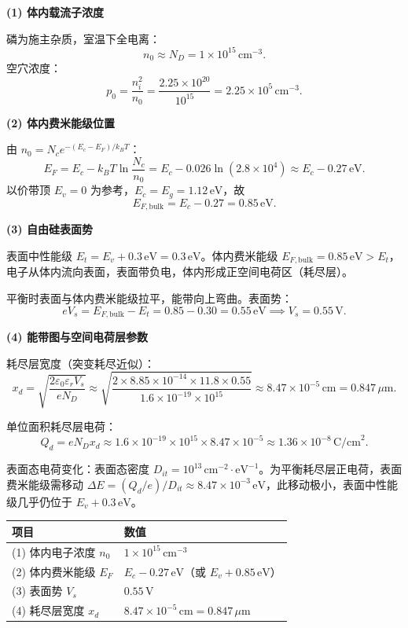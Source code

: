\begin{derivationbox}[标准解题过程]
\textbf{(1) 体内载流子浓度}

磷为施主杂质，室温下全电离：
\[
n_0\approx N_D=1\times10^{15}\,\text{cm}^{-3}.
\]
空穴浓度：
\[
p_0=\frac{n_i^2}{n_0}=\frac{2.25\times10^{20}}{10^{15}}=2.25\times10^5\,\text{cm}^{-3}.
\]

\textbf{(2) 体内费米能级位置}

由 $n_0=N_ce^{-(E_c-E_F)/k_BT}$：
\[
E_F=E_c-k_BT\ln\frac{N_c}{n_0}=E_c-0.026\ln(2.8\times10^4)\approx E_c-0.27\,\text{eV}.
\]
以价带顶 $E_v=0$ 为参考，$E_c=E_g=1.12\,\text{eV}$，故
\begin{equation}
\boxed{E_{F,\text{bulk}}=E_c-0.27=0.85\,\text{eV}.}
\end{equation}

\textbf{(3) 自由硅表面势}

表面中性能级 $E_t=E_v+0.3\,\text{eV}=0.3\,\text{eV}$。体内费米能级 $E_{F,\text{bulk}}=0.85\,\text{eV}>E_t$，电子从体内流向表面，表面带负电，体内形成正空间电荷区（耗尽层）。

平衡时表面与体内费米能级拉平，能带向上弯曲。表面势：
\begin{equation}
\boxed{eV_s=E_{F,\text{bulk}}-E_t=0.85-0.30=0.55\,\text{eV}\implies V_s=0.55\,\text{V}.}
\end{equation}

\textbf{(4) 能带图与空间电荷层参数}

耗尽层宽度（突变耗尽近似）：
\[
x_d=\sqrt{\frac{2\varepsilon_0\varepsilon_rV_s}{eN_D}}\approx\sqrt{\frac{2\times8.85\times10^{-14}\times11.8\times0.55}{1.6\times10^{-19}\times10^{15}}}\approx8.47\times10^{-5}\,\text{cm}=0.847\,\mu\text{m}.
\]

单位面积耗尽层电荷：
\[
Q_d=eN_Dx_d\approx1.6\times10^{-19}\times10^{15}\times8.47\times10^{-5}\approx1.36\times10^{-8}\,\text{C/cm}^2.
\]

表面态电荷变化：表面态密度 $D_{it}=10^{13}\,\text{cm}^{-2}\cdot\text{eV}^{-1}$。为平衡耗尽层正电荷，表面费米能级需移动 $\Delta E=(Q_d/e)/D_{it}\approx8.47\times10^{-3}\,\text{eV}$，此移动极小，表面中性能级几乎仍位于 $E_v+0.3\,\text{eV}$。
\end{derivationbox}

\begin{formulabox}[答案汇总]
\begin{center}
\begin{tabular}{ll}
\toprule
\textbf{项目} & \textbf{数值} \\
\midrule
(1) 体内电子浓度 $n_0$ & $1\times10^{15}\,\text{cm}^{-3}$ \\
(2) 体内费米能级 $E_F$ & $E_c-0.27\,\text{eV}$（或 $E_v+0.85\,\text{eV}$） \\
(3) 表面势 $V_s$ & $0.55\,\text{V}$ \\
(4) 耗尽层宽度 $x_d$ & $8.47\times10^{-5}\,\text{cm}=0.847\,\mu\text{m}$ \\
\bottomrule
\end{tabular}
\end{center}
\end{formulabox}

